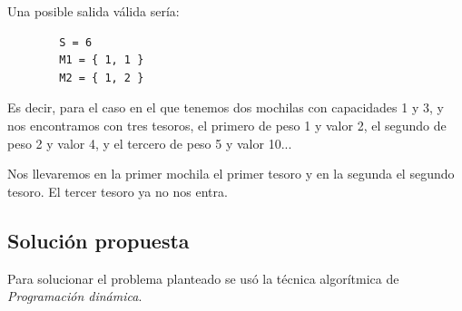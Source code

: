         Una posible salida válida sería:

        \begin{verbatim}
        S = 6
        M1 = { 1, 1 } 
        M2 = { 1, 2 }
        \end{verbatim}

        Es decir, para el caso en el que tenemos dos mochilas con capacidades 1 y 3, y nos encontramos con tres tesoros, el primero de peso 1 y valor 2, el segundo de peso 2 y valor 4, y el tercero de peso 5 y valor 10... \par Nos llevaremos en la primer mochila el primer tesoro y en la segunda el segundo tesoro. El tercer tesoro ya no nos entra.

    \subsection{Solución propuesta}
    Para solucionar el problema planteado se usó la técnica algorítmica de \emph{Programación dinámica}. \par

